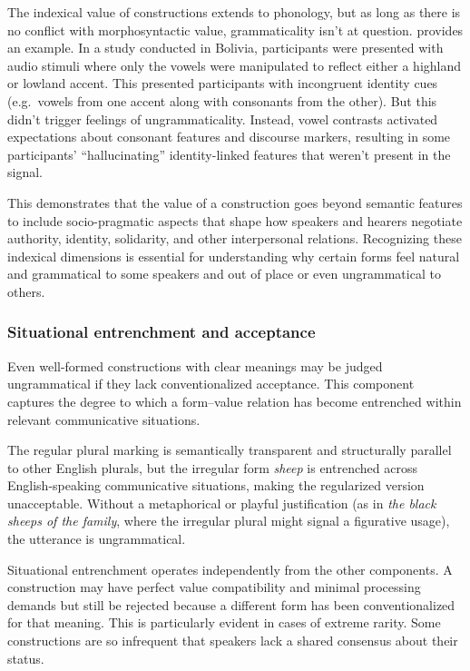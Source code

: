 \documentclass[12pt,letterpaper]{article}
\newcommand{\mention}[1]{\textit{#1}}
\begin{document}
The indexical value of constructions extends to phonology, but as long as there is no conflict with morphosyntactic value, grammaticality isn't at question. \textcite{Babel2025} provides an example. In a study conducted in Bolivia, participants were presented with audio stimuli where only the vowels were manipulated to reflect either a highland or lowland accent. This presented participants with incongruent identity cues (e.g.\, vowels from one accent along with consonants from the other). But this didn't trigger feelings of ungrammaticality. Instead, vowel contrasts activated expectations about consonant features and discourse markers, resulting in some participants' \enquote{hallucinating} identity-linked features that weren't present in the signal.

This demonstrates that the value of a construction goes beyond semantic features to include socio-pragmatic aspects that shape how speakers and hearers negotiate authority, identity, solidarity, and other interpersonal relations. Recognizing these indexical dimensions is essential for understanding why certain forms feel natural and grammatical to some speakers and out of place or even ungrammatical to others.

\subsubsection{Situational entrenchment and acceptance}\label{sec:community-acceptance}

Even well-formed constructions with clear meanings may be judged ungrammatical if they lack conventionalized acceptance. This component captures the degree to which a form--value relation has become entrenched within relevant communicative situations.

\label{ex:sheeps-entrench}
\z

The regular plural marking is semantically transparent and structurally parallel to other English plurals, but the irregular form \mention{sheep} is entrenched across English-speaking communicative situations, making the regularized version unacceptable. Without a metaphorical or playful justification (as in \mention{the black sheeps of the family}, where the irregular plural might signal a figurative usage), the utterance is ungrammatical.

Situational entrenchment operates independently from the other components. A construction may have perfect value compatibility and minimal processing demands but still be rejected because a different form has been conventionalized for that meaning. This is particularly evident in cases of extreme rarity. Some constructions are so infrequent that speakers lack a shared consensus about their status. 
\end{document}
